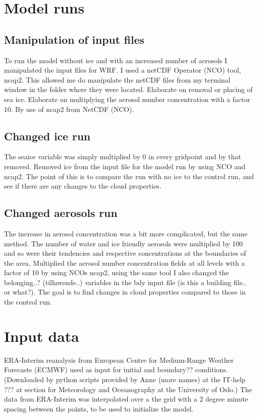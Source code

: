 \section{Model runs}
\subsection{Manipulation of input files}
To run the model without ice and with an increased number of aerosols I manipulated the input files for WRF. I used a netCDF Operator (NCO) tool, ncap2. This allowed me do manipulate the netCDF files from my terminal window in the folder where they were located.
Elaborate on removal or placing of sea ice. Elaborate on multiplying the aerosol number concentration with a factor 10. By use of ncap2 from NetCDF (NCO).

\subsection{Changed ice run}
The seaice variable was simply multiplied by 0 in every gridpoint and by that removed.
Removed ice from the input file for the model run by using NCO and ncap2. The point of this is to compare the run with no ice to the control run, and see if there are any changes to the cloud properties.

\subsection{Changed aerosols run}
The increase in aerosol concentration was a bit more complicated, but the same method. The number of water and ice friendly aerosols were multiplied by 100 and so were their tendencies and respective concentrations at the boundaries of the area.
Multiplied the aerosol number concentration fields at all levels with a factor of 10 by using NCOs ncap2, using the same tool I also changed the belonging..? (tilhørende..) variables in the bdy input file (is this a building file.. or what?). The goal is to find changes in cloud properties compared to those in the control run.

\section{Input data}
ERA-Interim reanalysis from European Centre for Medium-Range Weather Forecasts (ECMWF) used as input for initial and boundary?? conditions. (Downloaded by python scripts provided by Anne (more names) at the IT-help ??? at section for Meteorology and Oceanography at the University of Oslo.) The data from ERA-Interim was interpolated over a the grid with a 2 degree minute spacing between the points, to be used to initialize the model.

